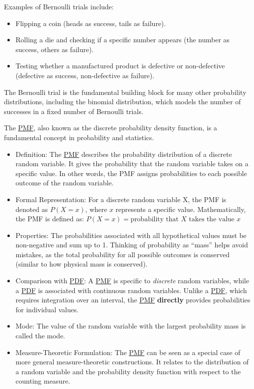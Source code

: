 \documentclass[
  a4paper,
]{scrbook}
\providecommand{\tightlist}{%
  \setlength{\itemsep}{0pt}\setlength{\parskip}{0pt}}\usepackage{longtable,booktabs,array}
\begin{document}
Examples of Bernoulli trials include:

\begin{itemize}
\tightlist
\item
  Flipping a coin (heads as success, tails as failure).
\item
  Rolling a die and checking if a specific number appears (the number as
  success, others as failure).
\item
  Testing whether a manufactured product is defective or non-defective
  (defective as success, non-defective as failure).
\end{itemize}

The Bernoulli trial is the fundamental building block for many other
probability distributions, including the binomial distribution, which
models the number of successes in a fixed number of Bernoulli trials.

The \hyperref[acronyms_PMF]{PMF}, also known as the discrete probability
density function, is a fundamental concept in probability and
statistics.

\begin{itemize}
\item
  Definition: The \hyperref[acronyms_PMF]{PMF} describes the probability
  distribution of a discrete random variable. It gives the probability
  that the random variable takes on a specific value. In other words,
  the PMF assigns probabilities to each possible outcome of the random
  variable.
\item
  Formal Representation: For a discrete random variable X, the PMF is
  denoted as \(P(X = x)\), where \(x\) represents a specific value.
  Mathematically, the PMF is defined as:
  \(P(X = x) = \text{{probability that }} X \text{{ takes the value }} x\)
\item
  Properties: The probabilities associated with all hypothetical values
  must be non-negative and sum up to 1. Thinking of probability as
  ``mass'' helps avoid mistakes, as the total probability for all
  possible outcomes is conserved (similar to how physical mass is
  conserved).
\item
  Comparison with \hyperref[acronyms_PDF]{PDF}: A
  \hyperref[acronyms_PMF]{PMF} is specific to \emph{discrete} random
  variables, while a \hyperref[acronyms_PDF]{PDF} is associated with
  continuous random variables. Unlike a \hyperref[acronyms_PDF]{PDF},
  which requires integration over an interval, the
  \hyperref[acronyms_PMF]{PMF} \textbf{directly} provides probabilities
  for individual values.
\item
  Mode: The value of the random variable with the largest probability
  mass is called the mode.
\item
  Measure-Theoretic Formulation: The \hyperref[acronyms_PMF]{PMF} can be
  seen as a special case of more general measure-theoretic
  constructions. It relates to the distribution of a random variable and
  the probability density function with respect to the counting measure.
\end{itemize}
\end{document}
